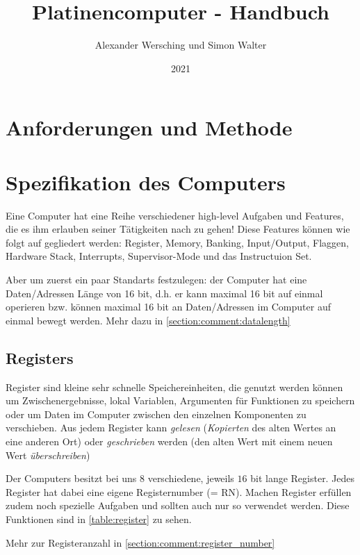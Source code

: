 \documentclass{scrartcl}
\begin{document}
\title{Platinencomputer - Handbuch}
\author{Alexander Wersching und Simon Walter}
\date{2021}
\maketitle
\newpage


\tableofcontents
\newpage

\section{Anforderungen und Methode}

\section{Spezifikation des Computers}
Eine Computer hat eine Reihe verschiedener high-level Aufgaben und Features, die es ihm erlauben seiner Tätigkeiten nach zu gehen! 
Diese Features können wie folgt auf gegliedert werden: Register, Memory, Banking, Input/Output, Flaggen, Hardware Stack, Interrupts, Supervisor-Mode und das Instructuion Set.

Aber um zuerst ein paar Standarts festzulegen: der Computer hat eine Daten/Adressen Länge von 16 bit, d.h. er kann maximal 16 bit auf einmal operieren bzw. können maximal 16 bit an Daten/Adressen im Computer auf einmal bewegt werden. Mehr dazu in \autoref{section:comment:datalength}



\subsection{Registers}
Register sind kleine sehr schnelle Speichereinheiten, die genutzt werden können um Zwischenergebnisse, lokal Variablen, Argumenten für Funktionen zu speichern oder um Daten im Computer zwischen den einzelnen Komponenten zu verschieben. Aus jedem Register kann \emph{gelesen} (\emph{Kopierten} des alten Wertes an eine anderen Ort) oder \emph{geschrieben} werden (den alten Wert mit einem neuen Wert \emph{überschreiben})

Der Computers besitzt bei uns $8$ verschiedene, jeweils $16$ bit lange Register. Jedes Register hat dabei eine eigene Registernumber (= RN). Machen Register erfüllen zudem noch spezielle Aufgaben und sollten auch nur so verwendet werden. Diese Funktionen sind in \autoref{table:register} zu sehen.

Mehr zur Registeranzahl in \autoref{section:comment:register_number}
\end{document}
